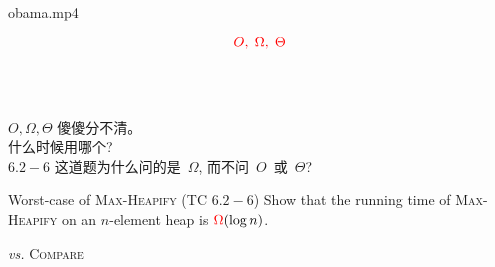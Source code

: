 
\begin{frame}{}
  \begin{center}
    \movie[showcontrols, poster, width = 0.50\textwidth, height = 0.30\textwidth]
    {}
    {obama.mp4}
  \end{center}

  \pause
  \[
    \textcolor{red}{O,\; \Omega,\; \Theta}
  \]

  \pause
  \begin{center}
      \\[5pt]
  \end{center}
\end{frame}

\begin{frame}{}
  \begin{CJK*}{UTF8}{gbsn}
    \begin{center}
      { \\[10pt]
      $O, \Omega, \Theta$ 傻傻分不清。\\[8pt]
      什么时候用哪个? \\[8pt]
      $6.2-6$ 这道题为什么问的是~$\Omega$, 而不问~$O$~或~$\Theta$?}
    \end{center}
  \end{CJK*}
\end{frame}

\begin{frame}{}
  \begin{exampleblock}{Worst-case of \textsc{Max-Heapify} (TC $6.2-6$)}
    Show that the  running time of \textsc{Max-Heapify} on an $n$-element heap is $\textcolor{red}{\Omega}(\log n)$.
  \end{exampleblock}

  \pause
  \vspace{0.60cm}
  \centerline{ {\it vs.} \textsc{Compare}}
\end{frame}

